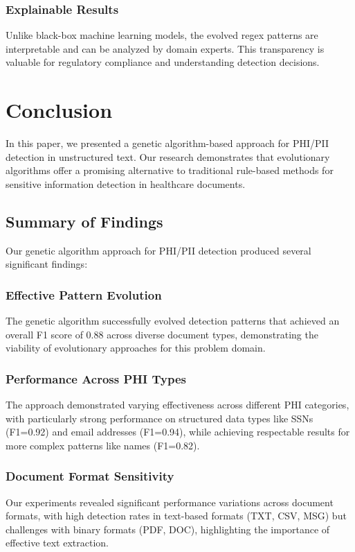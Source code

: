 \documentclass[conference]{IEEEtran}
\begin{document}
\subsubsection{\textbf{Explainable Results}} Unlike black-box machine learning models, the evolved regex patterns are interpretable and can be analyzed by domain experts. This transparency is valuable for regulatory compliance and understanding detection decisions.

\section{\textbf{Conclusion}}
In this paper, we presented a genetic algorithm-based approach for PHI/PII detection in unstructured text. Our research demonstrates that evolutionary algorithms offer a promising alternative to traditional rule-based methods for sensitive information detection in healthcare documents.

\subsection{\textbf{Summary of Findings}}
Our genetic algorithm approach for PHI/PII detection produced several significant findings:

\subsubsection{Effective Pattern Evolution} The genetic algorithm successfully evolved detection patterns that achieved an overall F1 score of 0.88 across diverse document types, demonstrating the viability of evolutionary approaches for this problem domain.

\subsubsection{Performance Across PHI Types} The approach demonstrated varying effectiveness across different PHI categories, with particularly strong performance on structured data types like SSNs (F1=0.92) and email addresses (F1=0.94), while achieving respectable results for more complex patterns like names (F1=0.82).

\subsubsection{Document Format Sensitivity} Our experiments revealed significant performance variations across document formats, with high detection rates in text-based formats (TXT, CSV, MSG) but challenges with binary formats (PDF, DOC), highlighting the importance of effective text extraction.
\end{document}
